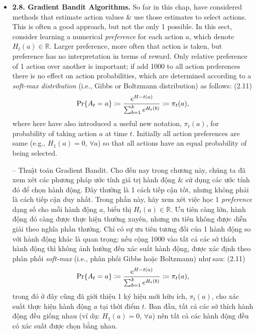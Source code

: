 \documentclass{article}
\newtheorem{problem}{Problem}
\begin{document}
\begin{itemize}
\begin{itemize}
\begin{problem}[UCB Spikes]
            -- Trong Hình 2.4, thuật toán UCB cho thấy hiệu suất tăng đột biến rõ rệt ở bước thứ 11. Tại sao vậy? Lưu ý: để câu trả lời của bạn được coi là hoàn toàn thỏa đáng, bạn phải giải thích được cả lý do tại sao phần thưởng tăng ở bước thứ 11 \& tại sao nó giảm ở các bước tiếp theo. Nếu $c = 1$, thì sự tăng đột biến sẽ ít rõ rệt hơn.
        \end{problem}
        \item {\bf2.8. Gradient Bandit Algorithms.} So far in this chap, have considered methods that estimate action values \& use those estimates to select actions. This is often a good approach, but not the only 1 possible. In this sect, consider learning a numerical {\it preference} for each action $a$, which denote $H_t(a)\in\mathbb{R}$. Larger preference, more often that action is taken, but preference has no interpretation in terms of reward. Only relative preference of 1 action over another is important; if add 1000 to all action preferences there is no effect on action probabilities, which are determined according to a {\it soft-max distribution} (i.e., Gibbs or Boltzmann distribution) as follows: (2.11)
        \begin{equation*}
            {\rm Pr}\{A_t = a\}\coloneqq\frac{e^{H-t(a)}}{\sum_{b=1}^k e^{H_t(b)}}\coloneqq\pi_t(a),
        \end{equation*}
        where here have also introduced a useful new notation, $\pi_t(a)$, for probability of taking action $a$ at time $t$. Initially all action preferences are same (e.g., $H_1(a) = 0$, $\forall a$) so that all actions have an equal probability of being selected.

        -- {\sf Thuật toán Gradient Bandit.} Cho đến nay trong chương này, chúng ta đã xem xét các phương pháp ước tính giá trị hành động \& sử dụng các ước tính đó để chọn hành động. Đây thường là 1 cách tiếp cận tốt, nhưng không phải là cách tiếp cận duy nhất. Trong phần này, hãy xem xét việc học 1 {\it preference} dạng số cho mỗi hành động $a$, biểu thị $H_t(a)\in\mathbb{R}$. Ưu tiên càng lớn, hành động đó càng được thực hiện thường xuyên, nhưng ưu tiên không được diễn giải theo nghĩa phần thưởng. Chỉ có sự ưu tiên tương đối của 1 hành động so với hành động khác là quan trọng; nếu cộng 1000 vào tất cả các sở thích hành động thì không ảnh hưởng đến xác suất hành động, được xác định theo phân phối {\it soft-max} (i.e., phân phối Gibbs hoặc Boltzmann) như sau: (2.11)
        \begin{equation*}
            {\rm Pr}\{A_t = a\}\coloneqq\frac{e^{H-t(a)}}{\sum_{b=1}^k e^{H_t(b)}}\coloneqq\pi_t(a),
        \end{equation*}
        trong đó ở đây cũng đã giới thiệu 1 ký hiệu mới hữu ích, $\pi_t(a)$, cho xác suất thực hiện hành động $a$ tại thời điểm $t$. Ban đầu, tất cả các sở thích hành động đều giống nhau (ví dụ: $H_1(a) = 0$, $\forall a$) nên tất cả các hành động đều có xác suất được chọn bằng nhau.


\end{itemize}
\end{itemize}
\end{document}
